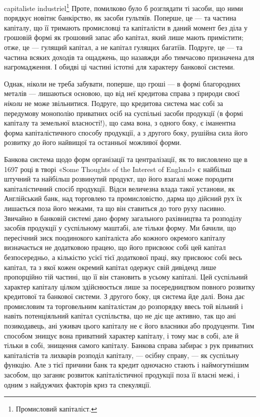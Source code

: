 \parcont{}  %
capitaliste industriel\footnote*{
Промисловий капіталіст. 
} Проте, помилково було б розглядати ті засоби, що ними
порядкує новітнє банкірство, як засоби гультяїв. Поперше, це — та частина
капіталу, що її тримають промисловці та капіталісти в даний момент без діла
у грошовій формі як грошовий запас або капітал, який лише мають примістити;
отже, це — гулящий капітал, а не капітал гулящих багатіїв. Подруге, це — та
частина всяких доходів та ощаджень, що назавжди або тимчасово призначена
для нагромадження. І обидві ці частині істотні для характеру банкової системи.

Однак, ніколи не треба забувати, поперше, що гроші — в формі благородних
металів — лишаються основою, що від неї кредитова справа з природи
своєї \emph{ніколи} не може звільнитися. Подруге, що кредитова система має собі
за передумову монополію приватних осіб на суспільні засоби продукції (в формі
капіталу та земельної власності!), що сама вона, з одного боку, є іманентна
форма капіталістичного способу продукції, а з другого боку, рушійна сила його
розвитку до його найвищої та останньої можливої форми.

Банкова система щодо форм організації та централізації, як то висловлено
ще в 1697 році в творі «Some Thoughts of the Interest of England» є найбільш
штучний та найбільш розвинутий продукт, що його взагалі може породити
капіталістичний спосіб продукцїї. Відси величезна влада такої установи,
як Англійський банк, над торговлею та промисловістю, дарма що дійсний рух
їх лишається поза його межами, та що він ставиться до того руху пасивно.
Звичайно в банковій системі дано форму загального рахівництва та розподілу
засобів продукції у суспільному маштабі, але тільки форму. Ми бачили, що пересічний
зиск поодинокого капіталіста або кожного окремого капіталу визначається
не додатковою працею, що його присвоює собі цей капітал безпосередньо,
а кількістю усієї тієї додаткової праці, яку присвоює собі весь капітал, та з якої
кожен окремий капітал одержує свій дивіденд лише пропорційно тій частині, що
її він становить в усьому капіталі. Цей суспільний характер капіталу цілком
здійснюється лише за посередництвом повного розвитку кредитової та банкової
системи. З другого боку, ця система йде далі. Вона дає промисловим та торговельним
капіталістам до розпорядку ввесь той вільний і навіть потенціяльний
капітал суспільства, що не діє ще активно, так що ані позикодавець, ані уживач
цього капіталу не є його власники або продуценти. Тим способом знищує
вона приватний характер капіталу, і тому має в собі, але й тільки в собі, знищення
самого капіталу. Банкова справа забирає з рук приватних капіталістів
та лихварів розподіл капіталу, — осібну справу, — як суспільну функцію. Але
з тієї причини банк та кредит одночасно стають і наймогутнішим засобом, що
заганяє розвиток капіталістичної продукції поза її власні межі, і одним з найдужчих
факторів криз та спекуляції.

